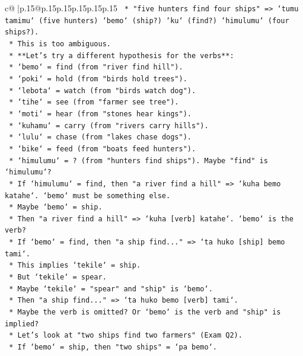 \documentclass{article}
\begin{document}
{\begin{supertabular}{c@{$\;$}|p{.15\linewidth}@{}p{.15\linewidth}p{.15\linewidth}p{.15\linewidth}p{.15\linewidth}p{.15\linewidth}}
{{{\texttt{                    *   "five hunters find four ships" => `tumu tamimu` (five hunters) `bemo` (ship?) `ku` (find?) `himulumu` (four ships?).} \\
\texttt{                    *   This is too ambiguous.} \\
\texttt{    *   **Let's try a different hypothesis for the verbs**:} \\
\texttt{        *   `bemo` = find (from "river find hill").} \\
\texttt{        *   `poki` = hold (from "birds hold trees").} \\
\texttt{        *   `lebota` = watch (from "birds watch dog").} \\
\texttt{        *   `tihe` = see (from "farmer see tree").} \\
\texttt{        *   `moti` = hear (from "stones hear kings").} \\
\texttt{        *   `kuhamu` = carry (from "rivers carry hills").} \\
\texttt{        *   `lulu` = chase (from "lakes chase dogs").} \\
\texttt{        *   `bike` = feed (from "boats feed hunters").} \\
\texttt{        *   `himulumu` = ? (from "hunters find ships"). Maybe "find" is `himulumu`?} \\
\texttt{        *   If `himulumu` = find, then "a river find a hill" => `kuha bemo katahe`. `bemo` must be something else.} \\
\texttt{        *   Maybe `bemo` = ship.} \\
\texttt{        *   Then "a river find a hill" => `kuha {[}verb{]} katahe`. `bemo` is the verb?} \\
\texttt{        *   If `bemo` = find, then "a ship find..." => `ta huko {[}ship{]} bemo tami`.} \\
\texttt{        *   This implies `tekile` = ship.} \\
\texttt{        *   But `tekile` = spear.} \\
\texttt{        *   Maybe `tekile` = "spear" and "ship" is `bemo`.} \\
\texttt{        *   Then "a ship find..." => `ta huko bemo {[}verb{]} tami`.} \\
\texttt{        *   Maybe the verb is omitted? Or `bemo` is the verb and "ship" is implied?} \\
\texttt{        *   Let's look at "two ships find two farmers" (Exam Q2).} \\
\texttt{        *   If `bemo` = ship, then "two ships" = `pa bemo`.} \\
}}}
\end{supertabular}}
\end{document}
